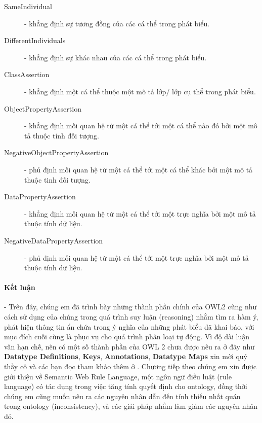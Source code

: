 \begin{description}
\item[SameIndividual] - khẳng định sự tương đồng của các cá thể trong phát biểu.

\item[DifferentIndividuals] - khẳng định sự khác nhau của các cá thể trong phát biểu.

\item[ClassAssertion] - khẳng định một cá thể thuộc một mô tả lớp/ lớp cụ thể trong phát biểu.

\item[ObjectPropertyAssertion] - khẳng định mối quan hệ từ một cá thể tới một cá thể nào đó bởi một mô tả thuộc tính đối tượng.

\item[NegativeObjectPropertyAssertion] - phủ định mối quan hệ từ một cá thể tới một cá thể khác bởi một mô tả thuộc tinh đối tượng.

\item[DataPropertyAssertion] - khẳng định mối quan hệ từ một cá thể tới một trực nghĩa bởi một mô tả thuộc tính dữ liệu.

\item[NegativeDataPropertyAssertion] - phủ định mối quan hệ từ một cá thể tới một trực nghĩa bởi một mô tả thuộc tính dữ liệu.
\end{description}

\paragraph{Kết luận} - Trên đây, chúng em đã trình bày những thành phần chính của OWL2 cũng như cách sử dụng của chúng trong quá trình suy luận (reasoning) nhằm tìm ra hàm ý, phát hiện thông tin ẩn chứa trong ý nghĩa của những phát biểu đã khai báo, với mục đích cuối cùng là phục vụ cho quá trình phân loại tự động. Vì độ dài luận văn hạn chế, nên có một số thành phần của OWL 2 chưa được nêu ra ở đây như \textbf{Datatype Definitions}, \textbf{Keys}, \textbf{Annotations}, \textbf{Datatype Maps} xin mời quý thầy cô và các bạn đọc tham khảo thêm ở \cite{owl2spec}. Chương tiếp theo chúng em xin được giới thiệu về Semantic Web Rule Language, một ngôn ngữ điều luật (rule language) có tác dụng trong việc tăng tính quyết định cho ontology, đồng thời chúng em cũng muốn nêu ra các nguyên nhân dẫn đến tính thiếu nhất quán trong ontology (inconsistency), và các giải pháp nhằm làm giảm các nguyên nhân đó.